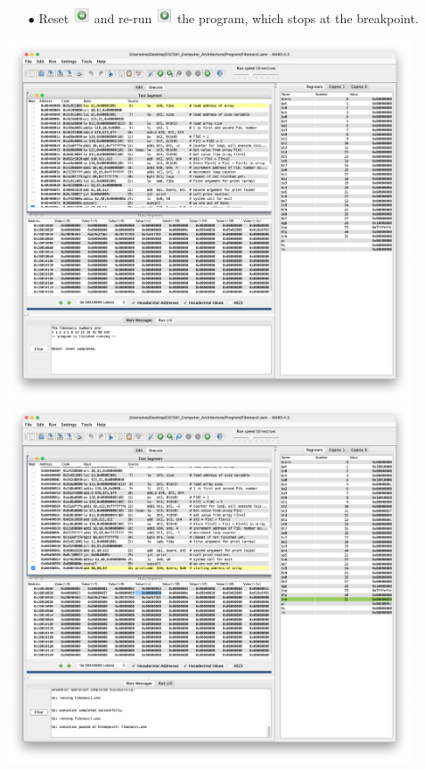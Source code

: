 \documentclass[12pt]{article}
\begin{document}
\begin{enumerate}
\begin{itemize}
        \item[$\bullet$] Reset        \includegraphics[width=0.04\textwidth]{20.png} and re-run \includegraphics[width=0.04\textwidth]{18.png} the program, which stops at the breakpoint.
    \end{itemize}
            \begin{center}
            \includegraphics[width=0.9\textwidth]{28.png}
            \includegraphics[width=0.9\textwidth]{29.png}
         \end{center}


\end{enumerate}
\end{document}
